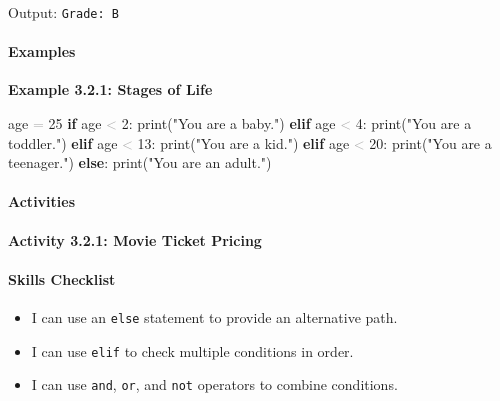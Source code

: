 \documentclass[
  justified,
  openright,
]{tufte-book}
\let\subsection\paragraph
\let\paragraph\paragraph
\newcommand{\KeywordTok}[1]{\textcolor{CodeKeyword}{\textbf{#1}}}  %
\newcommand{\StringTok}[1]{\textcolor{CodeString}{#1}}              %
\newcommand{\CodeNumTok}[1]{\textcolor{CodeNumber}{#1}}             %
\newcommand{\OperatorTok}[1]{\textcolor{DarkGray}{#1}}              %
\newenvironment{Shaded}{%
  \begin{mdframed}[style=TufteCode]%
}{%
  \end{mdframed}%
}
\let\subsection\paragraph
\let\paragraph\paragraph
\providecommand{\tightlist}{%
  \setlength{\itemsep}{0pt}\setlength{\parskip}{0pt}}
\begin{document}
Output: \texttt{Grade:\ B}

\subsection{Examples}\label{examples-7}

\textbf{Example 3.2.1: Stages of Life}

\begin{Shaded}
\begin{Highlighting}[]
age \OperatorTok{=} \CodeNumTok{25}
\KeywordTok{if} age \OperatorTok{\textless{}} \CodeNumTok{2}:
    print(\StringTok{"You are a baby."})
\KeywordTok{elif} age \OperatorTok{\textless{}} \CodeNumTok{4}:
    print(\StringTok{"You are a toddler."})
\KeywordTok{elif} age \OperatorTok{\textless{}} \CodeNumTok{13}:
    print(\StringTok{"You are a kid."})
\KeywordTok{elif} age \OperatorTok{\textless{}} \CodeNumTok{20}:
    print(\StringTok{"You are a teenager."})
\KeywordTok{else}:
    print(\StringTok{"You are an adult."})
\end{Highlighting}
\end{Shaded}

\subsection{Activities}\label{activities-8}

\textbf{Activity 3.2.1: Movie Ticket Pricing}

\begin{Shaded}
\end{Shaded}

\subsection{Skills Checklist}\label{skills-checklist-13}

\begin{itemize}
\tightlist
\item[$\square$]
  I can use an \texttt{else} statement to provide an alternative path.
\item[$\square$]
  I can use \texttt{elif} to check multiple conditions in order.
\item[$\square$]
  I can use \texttt{and}, \texttt{or}, and \texttt{not} operators to
  combine conditions.
\end{itemize}
\end{document}
